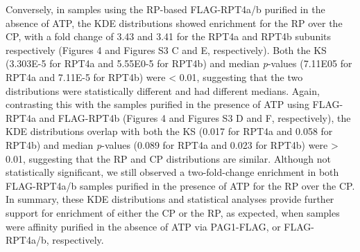 	Conversely, in samples using the RP-based FLAG-RPT4a/b purified in the absence of ATP, the KDE distributions showed enrichment for the RP over the CP, with a fold change of 3.43 and 3.41 for the RPT4a and RPT4b subunits respectively (Figures 4 and Figures S3 C and E, respectively). Both the KS (3.303E-5 for RPT4a and 5.55E0-5 for RPT4b) and median \textit{p}-values (7.11E05 for RPT4a and 7.11E-5 for RPT4b) were < 0.01, suggesting that the two distributions were statistically different and had different medians. Again, contrasting this with the samples purified in the presence of ATP using FLAG-RPT4a and FLAG-RPT4b (Figures 4 and Figures S3 D and F, respectively), the KDE distributions overlap with both the KS (0.017 for RPT4a and 0.058 for RPT4b) and median \textit{p}-values (0.089 for RPT4a and 0.023 for RPT4b) were > 0.01, suggesting that the RP and CP distributions are similar. Although not statistically significant, we still observed a two-fold-change enrichment in both FLAG-RPT4a/b samples purified in the presence of ATP for the RP over the CP. In summary, these KDE distributions and statistical analyses provide further support for enrichment of either the CP or the RP, as expected, when samples were affinity purified in the absence of ATP via PAG1-FLAG, or FLAG-RPT4a/b, respectively.

